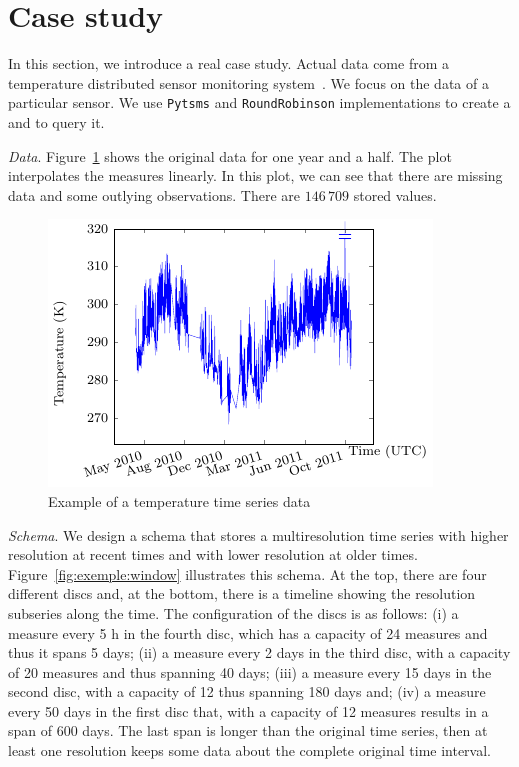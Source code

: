 
\section{Case study}
\label{sec:example}

In this section, we introduce a real case study. Actual data come from
a temperature distributed sensor monitoring system~\cite{alippi10}. We
focus on the data of a particular sensor. We use \texttt{Pytsms} and
\texttt{RoundRobinson} implementations to create a  and to
query it.

\emph{Data}. Figure~\ref{fig:exemple:original} shows the original data
for one year and a half. The plot interpolates the measures
linearly. In this plot, we can see that there are missing data and
some outlying observations. There are $146\,709$ stored values.

\begin{figure}[tp]
  \centering
  \includegraphics{fig_exemple_original.pdf}
  \caption{Example of a temperature time series data}
  \label{fig:exemple:original}
\end{figure}

\emph{Schema}. We design a  schema that stores a
multiresolution time series with higher resolution at recent times and
with lower resolution at older times. Figure~\ref{fig:exemple:window}
illustrates this schema. At the top, there are four different discs
and, at the bottom, there is a timeline showing the resolution subseries
along the time. The configuration of the discs is as follows: (i) a
measure every 5 h in the fourth disc, which has a capacity of 24
measures and thus it spans 5 days; (ii) a measure every 2 days in the
third disc, with a capacity of 20 measures and thus spanning 40 days;
(iii) a measure every 15 days in the second disc, with a capacity of
12 thus spanning 180 days and; (iv) a measure every 50 days in the
first disc that, with a capacity of 12 measures results in a span of
600 days. The last span is longer than the original time series, then
at least one resolution keeps some data about the complete original
time interval.

